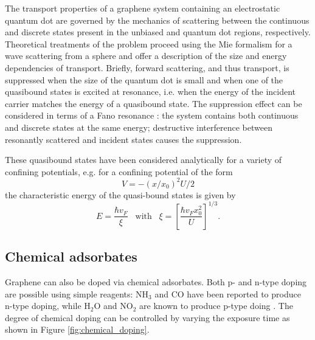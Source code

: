 \documentclass[edeposit,fullpage,draftthesis]{uiucthesis2009}
\begin{document}
        The transport properties of a graphene system containing an electrostatic quantum dot
        are governed by the mechanics of scattering between the continuous and discrete states
        present in the unbiased and quantum dot regions, respectively. Theoretical treatments of the
        problem \cite{heinisch2013mie, bardarson2009electrostatic}
        proceed using the Mie formalism \cite{mie1908beitrage} for a wave scattering from a sphere 
        and offer a description of the
        size and energy dependencies of transport. Briefly, forward scattering, and thus transport,
        is suppressed when the size of the quantum dot is small and
        when one of the quasibound states is excited at resonance,
        i.e. when the energy of the incident carrier matches the energy of a quasibound state.
        The suppression effect can be considered in terms of a Fano resonance \cite{fano1961effects}:
        the system contains both continuous and discrete states at the same energy;
        destructive interference between resonantly scattered and incident states causes the suppression.
        
        These quasibound states have been considered analytically for a variety of confining potentials, 
        e.g. for a confining potential of the form
        \begin{equation}
            V = -(x/x_0)^2 U / 2
        \end{equation}
        the characteristic energy of the quasi-bound states is given by \cite{silvestrov2007quantum}
        \begin{equation}
            E = \frac{\hbar v_F}{\xi} \;\;\; \text{with} \;\;\; \xi = \left[ \frac{\hbar v_F x_0^2}{U} \right]^{1/3}.
        \end{equation}
        
        \subsection{Chemical adsorbates}
       
        Graphene can also be doped via chemical adsorbates. Both p- and n-type doping are possible
        using simple reagents: NH$_3$ and CO have been reported to produce n-type doping,
        while H$_2$O and NO$_2$ are known to produce p-type doing \cite{schedin2007detection}.
        The degree of chemical doping can be controlled by varying the exposure time as shown in 
        Figure \ref{fig:chemical_doping}.
        
\end{document}
